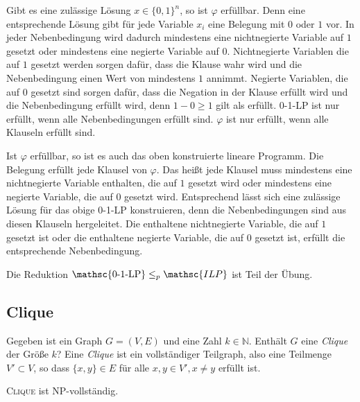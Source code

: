 \begin{Bew}
  Gibt es eine zulässige Lösung $x \in \{ 0, 1 \}^n$, so ist $\varphi$ erfüllbar. Denn eine entsprechende Lösung gibt für jede Variable $x_i$ eine Belegung mit $0$ oder $1$ vor. In jeder Nebenbedingung wird dadurch mindestens eine nichtnegierte Variable auf $1$ gesetzt oder mindestens eine negierte Variable auf $0$. Nichtnegierte Variablen die auf $1$ gesetzt werden sorgen dafür, dass die Klause wahr wird und die Nebenbedingung einen Wert von mindestens $1$ annimmt. Negierte Variablen, die auf $0$ gesetzt sind sorgen dafür, dass die Negation in der Klause erfüllt wird und die Nebenbedingung erfüllt wird, denn $1-0 \ge 1$ gilt als erfüllt. \textsc{0-1-LP} ist nur erfüllt, wenn alle Nebenbedingungen erfüllt sind. $\varphi$ ist nur erfüllt, wenn alle Klauseln erfüllt sind.
  
  Ist $\varphi$ erfüllbar, so ist es auch das oben konstruierte lineare Programm. Die Belegung erfüllt jede Klausel von $\varphi$. Das heißt jede Klausel muss mindestens eine nichtnegierte Variable enthalten, die auf $1$ gesetzt wird oder mindestens eine negierte Variable, die auf $0$ gesetzt wird. Entsprechend lässt sich eine zulässige Lösung für das obige \textsc{0-1-LP} konstruieren, denn die Nebenbedingungen sind aus diesen Klauseln hergeleitet. Die enthaltene nichtnegierte Variable, die auf $1$ gesetzt ist oder die enthaltene negierte Variable, die auf $0$ gesetzt ist, erfüllt die entsprechende Nebenbedingung.
  
  Die Reduktion $\operatorname{\mathsc{0-1-LP}} \le_p \mathsc{ILP}$ ist Teil der Übung.
\end{Bew}


\subsection{Clique}
Gegeben ist ein Graph $G=(V,E)$ und eine Zahl $k \in \mathbb{N}$. Enthält $G$ eine \textit{Clique} der Größe $k$? Eine \textit{Clique} ist ein vollständiger Teilgraph, also eine Teilmenge $V' \subset V$, so dass $\{x, y\} \in E$ für alle $x, y \in V', x \neq y$ erfüllt ist.

\begin{Satz}
  \hspace{\parindent}\textsc{Clique} ist \textsf{NP}-vollständig.
\end{Satz}

